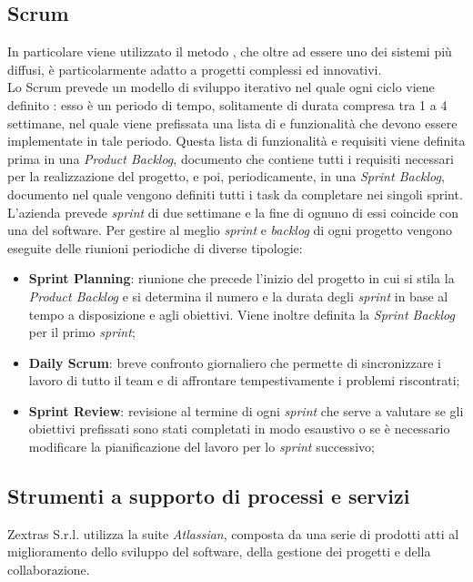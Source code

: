 \subsection{Scrum}
In particolare  viene utilizzato il metodo , che oltre ad essere uno dei sistemi più diffusi, è particolarmente adatto a progetti complessi ed innovativi.\\
Lo Scrum prevede un modello di sviluppo iterativo nel quale ogni ciclo viene definito : esso è un periodo di tempo, solitamente di durata compresa tra 1 a 4 settimane, nel quale viene prefissata una lista di  e funzionalità che devono essere implementate in tale periodo.
Questa lista di funzionalità e requisiti viene definita prima in una \emph{Product Backlog}, documento che contiene tutti i requisiti necessari per la realizzazione del progetto, e poi, periodicamente, in una \emph{Sprint Backlog}, documento nel quale vengono definiti tutti i task da completare nei singoli sprint.
L'azienda prevede \emph{sprint} di due settimane e la fine di ognuno di essi coincide con una  del software.
Per gestire al meglio \emph{sprint} e \emph{backlog} di ogni progetto vengono eseguite delle riunioni periodiche di diverse tipologie:
\begin{itemize}
	\item \textbf{Sprint Planning}: riunione che precede l'inizio del progetto in cui si stila la \emph{Product Backlog} e si determina il numero e la durata degli \emph{sprint} in base al tempo a disposizione e agli obiettivi. Viene inoltre definita la \emph{Sprint Backlog} per il primo \emph{sprint};
	\item \textbf{Daily Scrum}: breve confronto giornaliero che permette di sincronizzare i lavoro di tutto il team e di affrontare tempestivamente i problemi riscontrati;
	\item \textbf{Sprint Review}: revisione al termine di ogni \emph{sprint} che serve a valutare se gli obiettivi prefissati sono stati completati in modo esaustivo o se è necessario modificare la pianificazione del lavoro per lo \emph{sprint} successivo;
\end{itemize}

\subsection{Strumenti a supporto di processi e servizi}
Zextras S.r.l. utilizza la suite \emph{Atlassian}, composta da una serie di prodotti atti al miglioramento dello sviluppo del software, della gestione dei progetti e della collaborazione. 
